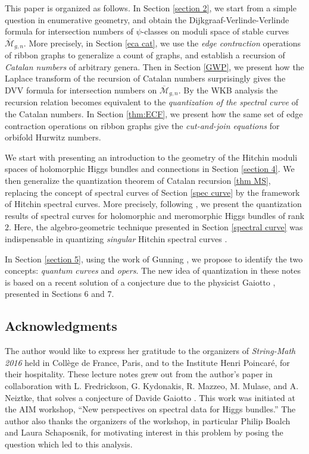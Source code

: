 \documentclass[oneside, 11pt]{amsart}
\theoremstyle{definition}
\numberwithin{equation}{subsection}
\newcommand{\Mbar}{{\overline{\mathcal{M}}}}
\begin{document}
This paper is organized as follows. In Section \ref{section 2}, we start from a simple question in enumerative geometry, and obtain the 
Dijkgraaf-Verlinde-Verlinde formula
\cite{DVV} for intersection numbers of $\psi$-classes on moduli space of stable curves $\Mbar_{g,n}$. More precisely, in Section \ref{eca cat}, we use the \textit{edge contraction} operations of ribbon graphs to generalize a count of graphs, and establish a recursion of \textit{Catalan numbers} of arbitrary genera. Then in Section \ref{GWP}, we present how the Laplace transform of the recursion of Catalan numbers surprisingly gives the DVV formula for intersection numbers on $\Mbar_{g,n}$. By the WKB analysis the recursion relation becomes equivalent to the \textit{quantization of the spectral curve} of the Catalan numbers. In Section \ref{thm:ECF}, we present how the same set of edge contraction operations on ribbon graphs give the \emph{cut-and-join equations} for orbifold Hurwitz numbers. 

We start with  presenting an introduction to the geometry of the Hitchin moduli spaces of holomorphic Higgs bundles and connections
in Section \ref{section 4}.  We then generalize the quantization theorem of Catalan recursion \ref{thm MS}, replacing the concept of spectral curves of Section \ref{spec curve} by the framework of Hitchin spectral curves. More precisely, following \cite{OD8, OD12,OD17},  we present the quantization results of spectral curves  for holomorphic and meromorphic Higgs bundles of rank $2$. Here, the algebro-geometric technique presented in Section \ref{spectral curve} was indispensable in quantizing \emph{singular} Hitchin spectral curves \cite{OD12}.

In Section \ref{section 5}, using the  work of Gunning \cite{Gun}, we propose to identify the two concepts: \textit{quantum curves} and \textit{opers}. The new idea of quantization in these notes is based on a recent solution \cite{OD20} of a conjecture due to the physicist  Gaiotto \cite{G}, presented in Sections 6 and 7. 

\subsection{Acknowledgments}

The author would like to express her gratitude to the organizers of \emph{String-Math 2016} held in 
Coll\`ege de France, Paris, and to the Institute Henri Poincar\'e, for their hospitality. These lecture notes grew out from the author's
paper \cite{OD20} in collaboration with L. Fredrickson, G. Kydonakis, R. Mazzeo, M. Mulase, and A. Neiztke, that solves a conjecture of Davide Gaiotto \cite{G}. This work was initiated at the AIM workshop, ``New perspectives on spectral data for Higgs bundles.'' The author also thanks the organizers of the workshop, in particular  Philip Boalch and Laura Schaposnik, for motivating interest in this problem by posing the question which led to this analysis.
\end{document}
